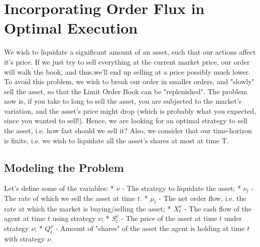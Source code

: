 \newpage

\section{Incorporating Order Flux in Optimal Execution}

We wish to liquidate a significant amount of an asset, such that
our actions affect it's price.
If we just try to sell everything at the current market price, our order will walk the book, and thus,we'll end up selling at a price possibly much lower. To avoid this problem, we wish to break our order
in smaller orders, and "slowly" sell the asset, so that the Limit Order Book can be "replenished".
The problem now is, if you take to long to sell the asset, you are subjected to the market's variation,
and the asset's price might drop (which is probably what you expected, since you wanted to sell!).
Hence, we are looking for an optimal strategy to sell the asset, i.e. how fast should we sell it?
Also, we consider that our time-horizon is finite, i.e. we wish to liquidate all the asset's shares
at most at time T.

\subsection{Modeling the Problem}
Let's define some of the variables:
* $\nu$ - The strategy to liquidate the asset;
* $\nu_t$ - The rate of which we sell the asset at time $t$.
* $\mu_t$ - The net order flow, i.e. the rate at which the market is buying/selling the asset;
* $X_t^\nu$ - The cash flow of the agent at time $t$ using strategy $\nu$;
* $S_t^\nu$ - The price of the asset at time $t$ under strategy $\nu$;
* $Q_t^\nu$ - Amount of "shares" of the asset the agent is holding at time $t$ with strategy $\nu$.


